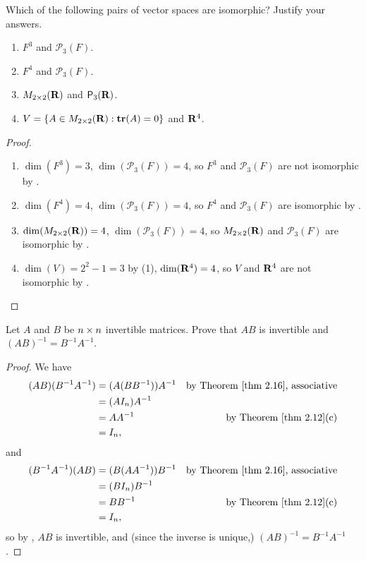 \begin{exercise} \label{exercise 2.4.3}
Which of the following pairs of vector spaces are isomorphic?
Justify your answers.
\begin{enumerate}
\item \(F^3\) and \(\mathcal{P}_3(F)\).
\item \(F^4\) and \(\mathcal{P}_3(F)\).
\item \(M_{2 \times 2}(\mathbf{R})\) and \(\textsf{P}_3(\mathbf{R})\).
\item \(V = \{ A \in M_{2 \times 2}(\mathbf{R}) : \textbf{tr}(A) = 0 \}\) and \(\mathbf{R}^4\).
\end{enumerate}
\end{exercise}

\begin{proof} \ 
\begin{enumerate}
\item \(\dim(F^3) = 3\), \(\dim(\mathcal{P}_3(F)) = 4\), so \(F^3\) and \(\mathcal{P}_3(F)\) are not isomorphic by .
\item \(\dim(F^4) = 4\), \(\dim(\mathcal{P}_3(F)) = 4\), so \(F^4\) and \(\mathcal{P}_3(F)\) are isomorphic by .
\item \(\dim(M_{2 \times 2}(\mathbf{R})) = 4\), \(\dim(\mathcal{P}_3(F)) = 4\), so \(M_{2 \times 2}(\mathbf{R})\) and \(\mathcal{P}_3(F)\) are isomorphic by .
\item \(\dim(V) = 2^2 - 1 = 3\) by \ATHM{1.19}(1), \(\dim(\mathbf{R}^4) = 4\), so \(V\) and \(\mathbf{R}^4\) are not isomorphic by \THM{2.19}.
\end{enumerate}
\end{proof}

\begin{exercise} \label{exercise 2.4.4}
Let \(A\) and \(B\) be \(n \times n\) invertible matrices.
Prove that \(AB\) is invertible and \((AB)^{-1} = B^{-1}A^{-1}\).
\end{exercise}

\begin{proof}
We have
\begin{align*}
    (AB)(B^{-1}A^{-1}) & = ( A(B B^{-1}) )A^{-1} & \text{by \THM{2.16}, associative} \\
                       & = (A I_n) A^{-1} \\
                       & = A A^{-1} & \text{by \THM{2.12}(c)} \\
                       & = I_n,
\end{align*}
and
\begin{align*}
    (B^{-1}A^{-1})(AB) & = ( B(A A^{-1}) )B^{-1} & \text{by \THM{2.16}, associative} \\
                       & = (B I_n) B^{-1} \\
                       & = B B^{-1} & \text{by \THM{2.12}(c)} \\
                       & = I_n,
\end{align*}
so by , \(AB\) is invertible, and (since the inverse is unique,) \((AB)^{-1} = B^{-1} A^{-1}\).
\end{proof}

